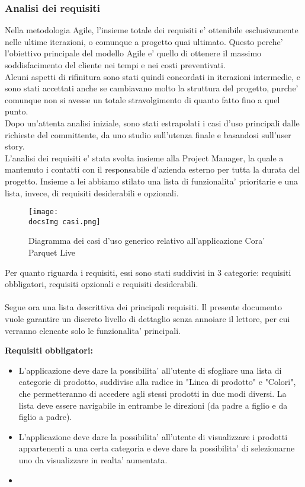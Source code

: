 \subsubsection{Analisi dei requisiti}
Nella metodologia Agile, l'insieme totale dei requisiti e' ottenibile esclusivamente nelle ultime iterazioni, o comunque a progetto quai ultimato. Questo perche' l'obiettivo principale del modello Agile e' quello di ottenere il massimo soddisfacimento del cliente nei tempi e nei costi preventivati.\\
Alcuni aspetti di rifinitura sono stati quindi concordati in iterazioni intermedie, e sono stati accettati anche se cambiavano molto la struttura del progetto, purche' comunque non si avesse un totale stravolgimento di quanto fatto fino a quel punto.\\
Dopo un'attenta analisi iniziale, sono stati estrapolati i casi d'uso principali dalle richieste del committente, da uno studio sull'utenza finale e basandosi sull'user story.\\
L'analisi dei requisiti e' stata svolta insieme alla Project Manager, la quale a mantenuto i contatti con il responsabile d'azienda esterno per tutta la durata del progetto. Insieme a lei abbiamo stilato una lista di funzionalita' prioritarie e una lista, invece, di requisiti desiderabili e opzionali.

\begin{figure}[H]
	\centering
	\texttt{[image: \\docsImg casi.png]}
	\caption{Diagramma dei casi d'uso generico relativo all'applicazione Cora' Parquet Live}
	\label{fig:Diagramma dei casi d'uso generico relativo all'applicazione Cora' Parquet Live}
\end{figure}

Per quanto riguarda i requisiti, essi sono stati suddivisi in 3 categorie: requisiti obbligatori, requisiti opzionali e requisiti desiderabili.\\\\
Segue ora una lista descrittiva dei principali requisiti. Il presente documento vuole garantire un discreto livello di dettaglio senza annoiare il lettore, per cui verranno elencate solo le funzionalita' principali.

\textbf{Requisiti obbligatori:}

\begin{itemize}
	\item L'applicazione deve dare la possibilita' all'utente di sfogliare una lista di categorie di prodotto, suddivise alla radice in  "Linea di prodotto" e "Colori", che permetteranno di accedere agli stessi prodotti in due modi diversi. La lista deve essere navigabile in entrambe le direzioni (da padre a figlio e da figlio a padre).
	
	\item L'applicazione deve dare la possibilita' all'utente di visualizzare i prodotti appartenenti a una certa categoria e deve dare la possibilita' di selezionarne uno da visualizzare in realta' aumentata.
	
	\item 
\end{itemize}


